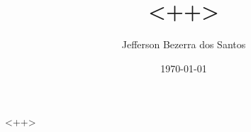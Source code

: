 \documentclass[a4paper,11pt]{article}
\date{\today}
\title{<++>}
\author{Jefferson Bezerra dos Santos}
\begin{document}
\maketitle
<++>
\end{document}
